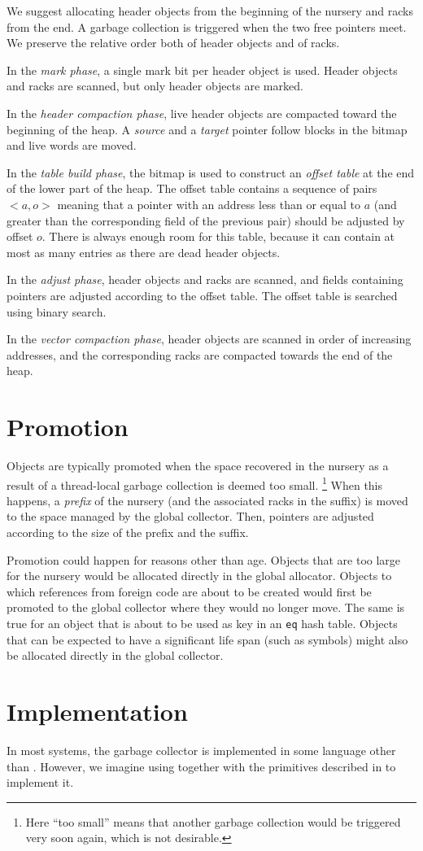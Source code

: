 We suggest allocating header objects from the beginning of the nursery
and racks from the end.  A garbage collection is triggered
when the two free pointers meet.  We preserve the relative order both
of header objects and of racks. 

In the \emph{mark phase}, a single mark bit per header object is
used.  Header objects and racks are scanned, but only
header objects are marked.  

In the \emph{header compaction phase}, live header objects are compacted
toward the beginning of the heap.  A \emph{source} and a \emph{target}
pointer follow blocks in the bitmap and live words are moved. 

In the \emph{table build phase}, the bitmap is used to construct an
\emph{offset table} at the end of the lower part of the heap.  The
offset table contains a sequence of pairs $<a,o>$ meaning that a
pointer with an address less than or equal to $a$ (and greater than
the corresponding field of the previous pair) should be adjusted by
offset $o$.  There is always enough room for this table, because it
can contain at most as many entries as there are dead header objects.  

In the \emph{adjust phase}, header objects and racks are
scanned, and fields containing pointers are adjusted according to the
offset table.  The offset table is searched using binary search. 

In the \emph{vector compaction phase}, header objects are scanned in
order of increasing addresses, and the corresponding racks
are compacted towards the end of the heap.

\section{Promotion}

Objects are typically promoted when the space recovered in the nursery
as a result of a thread-local garbage collection is deemed too small.%
\footnote{Here ``too small'' means that another garbage collection
  would be triggered very soon again, which is not desirable.}  When
this happens, a \emph{prefix} of the nursery (and the associated
racks in the suffix) is moved to the space managed by the
global collector.  Then, pointers are adjusted according to the size
of the prefix and the suffix. 

Promotion could happen for reasons other than age.  Objects that are
too large for the nursery would be allocated directly in the global
allocator.  Objects to which references from foreign code are
about to be created would first be promoted to the global collector
where they would no longer move.  The same is true for an object that
is about to be used as key in an \texttt{eq} hash table.  Objects that
can be expected to have a significant life span (such as symbols)
might also be allocated directly in the global collector. 

\section{Implementation}

In most systems, the garbage collector is implemented in some language
other than \cl{}.  However, we imagine using \cl{} together with the
primitives described in  to
implement it.

